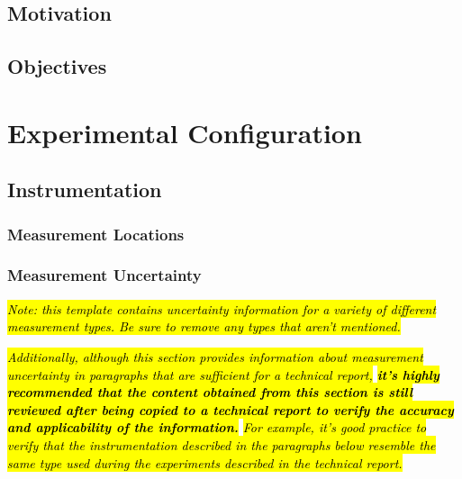 \documentclass[12pt,oneside]{book}
\begin{document}
\section{Motivation}

\section{Objectives}


\chapter{Experimental Configuration}
\label{chap:exp_config}

\section{Instrumentation}
\label{sec:instrument}

\subsection{Measurement Locations}
\label{subsec:measure_locs}

\subsection{Measurement Uncertainty}
\label{subsec:uncertainty}

\textit{\hl{Note: this template contains uncertainty information for a variety of different measurement types. Be sure to remove any types that aren't mentioned.}} 

\textit{\hl{Additionally, although this section provides information about measurement uncertainty in paragraphs that are sufficient for a technical report,}\textbf{\hl{ it's highly recommended that the content obtained from this section is still reviewed after being copied to a technical report to verify the accuracy and applicability of the information.}}\hl{ For example, it's good practice to verify that the instrumentation described in the paragraphs below resemble the same type used during the experiments described in the technical report.}}
\end{document}
